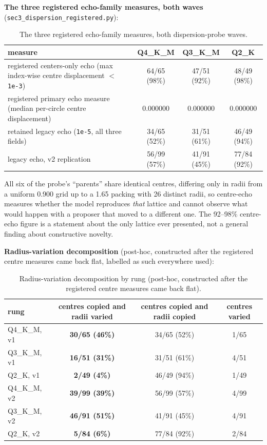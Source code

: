 \textbf{The three registered echo-family measures, both waves} (\texttt{sec3\_dispersion\_registered.py}):

\begin{table}[htbp]
\centering
\caption{The three registered echo-family measures, both dispersion-probe waves.}
\begin{tabular}{p{6.7cm}ccc}
\toprule
measure & Q4\_K\_M & Q3\_K\_M & Q2\_K \\
\midrule
registered centers-only echo (max index-wise centre displacement $<$ \texttt{1e-3}) & 64/65 (98\%) & 47/51 (92\%) & 48/49 (98\%) \\
registered primary echo measure (median per-circle centre displacement) & 0.000000 & 0.000000 & 0.000000 \\
retained legacy echo (\texttt{1e-5}, all three fields) & 34/65 (52\%) & 31/51 (61\%) & 46/49 (94\%) \\
legacy echo, v2 replication & 56/99 (57\%) & 41/91 (45\%) & 77/84 (92\%) \\
\bottomrule
\end{tabular}
\end{table}

All six of the probe's ``parents'' share identical centres, differing only in radii from a uniform 0.900 grid up to a 1.65 packing with 26 distinct radii, so centre-echo measures whether the model reproduces \emph{that} lattice and cannot observe what would happen with a proposer that moved to a different one. The 92--98\% centre-echo figure is a statement about the only lattice ever presented, not a general finding about constructive novelty.

\textbf{Radius-variation decomposition} (post-hoc, constructed after the registered centre measures came back flat, labelled as such everywhere used):

\begin{table}[htbp]
\centering
\caption{Radius-variation decomposition by rung (post-hoc, constructed after the
registered centre measures came back flat).}
\begin{tabular}{lccc}
\toprule
rung & centres copied and radii varied & centres copied and radii copied & centres varied \\
\midrule
Q4\_K\_M, v1 & \textbf{30/65 (46\%)} & 34/65 (52\%) & 1/65 \\
Q3\_K\_M, v1 & \textbf{16/51 (31\%)} & 31/51 (61\%) & 4/51 \\
Q2\_K, v1 & \textbf{2/49 (4\%)} & 46/49 (94\%) & 1/49 \\
Q4\_K\_M, v2 & \textbf{39/99 (39\%)} & 56/99 (57\%) & 4/99 \\
Q3\_K\_M, v2 & \textbf{46/91 (51\%)} & 41/91 (45\%) & 4/91 \\
Q2\_K, v2 & \textbf{5/84 (6\%)} & 77/84 (92\%) & 2/84 \\
\bottomrule
\end{tabular}
\end{table}

